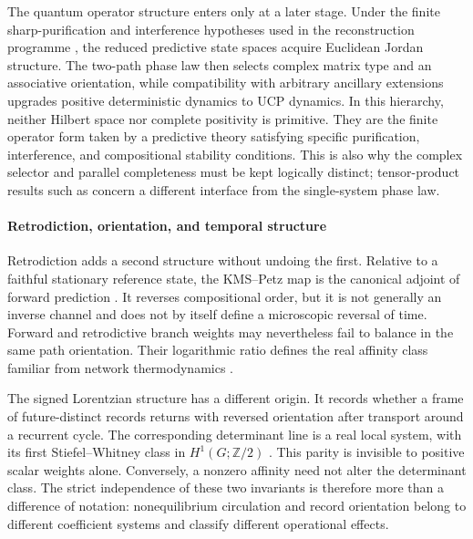 \documentclass[11pt]{article}
\theoremstyle{definition}
\theoremstyle{remark}
\newcommand{\Ztwo}{\mathbb Z/2}
\begin{document}
The quantum operator structure enters only at a later stage.  Under the finite
sharp-purification and interference hypotheses used in the reconstruction
programme \cite{ChiribellaDAPS2009,ChiribellaScandolo2015,
BarnumLeeScandoloSelby2017,BarnumUdudecVdW2023}, the reduced predictive state
spaces acquire Euclidean Jordan structure.  The two-path phase law then selects
complex matrix type and an associative orientation, while compatibility with
arbitrary ancillary extensions upgrades positive deterministic dynamics to
UCP dynamics.  In this hierarchy, neither Hilbert space nor complete positivity
is primitive.  They are the finite operator form taken by a predictive theory
satisfying specific purification, interference, and compositional stability
conditions.  This is also why the complex selector and parallel completeness
must be kept logically distinct; tensor-product results such as
\cite{HancheOlsen1985} concern a different interface from the single-system
phase law.

\paragraph{Retrodiction, orientation, and temporal structure} Retrodiction adds a second structure without undoing the first.  Relative to a
faithful stationary reference state, the KMS--Petz map is the canonical adjoint
of forward prediction \cite{AccardiCecchini1982,Petz1986,Petz2003}.  It reverses
compositional order, but it is not generally an inverse channel and does not by
itself define a microscopic reversal of time.  Forward and retrodictive branch
weights may nevertheless fail to balance in the same path orientation.  Their
logarithmic ratio defines the real affinity class familiar from network
thermodynamics \cite{Schnakenberg1976,LebowitzSpohn1999,AndrieuxGaspard2007}.

The signed Lorentzian structure has a different origin.  It records whether a
frame of future-distinct records returns with reversed orientation after
transport around a recurrent cycle.  The corresponding determinant line is a
real local system, with its first Stiefel--Whitney class in
$H^1(G;\Ztwo)$ \cite{ZingerDeterminant2016}.  This parity is invisible to
positive scalar weights alone.  Conversely, a nonzero affinity need not alter
the determinant class.  The strict independence of these two invariants is
therefore more than a difference of notation: nonequilibrium circulation and
record orientation belong to different coefficient systems and classify
different operational effects.
\end{document}

